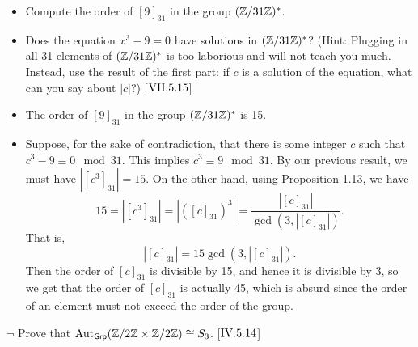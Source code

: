 \begin{exercise} %
	\begin{itemize}[wide]
		$\neg$
		\item Compute the order of $[9]_{31}$ in the group $(\mathbb{Z}/31\mathbb{Z})^*$.
		\item Does the equation $x^3- 9 = 0$ have solutions in $(\mathbb{Z}/31\mathbb{Z})^*$? (Hint: Plugging in all 31 elements of $(\mathbb{Z}/31\mathbb{Z})^*$ is too laborious and will not teach you much. Instead, use the result of the first part: if $c$ is a solution of the equation, what can you say about $|c|$?) [$\RNo{7}.5.15$]
	\end{itemize}
\end{exercise}
\begin{solution}\leavevmode
	\begin{itemize}
		\item The order of $[9]_{31}$ in the group $(\mathbb{Z}/31\mathbb{Z})^*$ is 15.
		\item Suppose, for the sake of contradiction, that there is some integer $c$ such that $c^3 - 9 \equiv 0 \mod 31$. This implies $c^3 \equiv 9 \mod 31$. By our previous result, we must have $|[c^3]_{31}| = 15$. On the other hand, using Proposition 1.13, we have 
		\[
			15 = |[c^3]_{31}| = |([c]_{31})^3| = \frac{|[c]_{31}|}{\gcd(3,|[c]_{31}|)}.
		\]
		That is,
		\[
			|[c]_{31}| = 15\gcd(3,|[c]_{31}|).
		\]
		Then the order of $[c]_31$ is divisible by 15, and hence it is divisible by 3, so we get that the order of $[c]_31$ is actually 45, which is absurd since the order of an element must not exceed the order of the group.
	\end{itemize}
\end{solution}
\begin{exercise}
	$\neg$ Prove that $\operatorname{Aut}_{\textsf{Grp}}(\mathbb{Z}/2\mathbb{Z}\times \mathbb{Z}/2\mathbb{Z}) \cong S_3$. [$\RNo{4}.5.14$]
\end{exercise}
